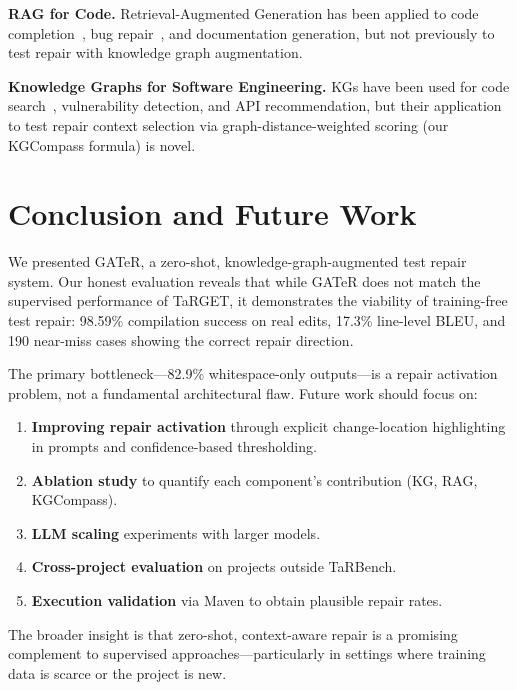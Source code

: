 \documentclass[conference,10pt]{IEEEtran}
\begin{document}
\textbf{RAG for Code.}  Retrieval-Augmented Generation has been applied
to code completion~\cite{rag_code2023}, bug repair~\cite{rag_repair2024},
and documentation generation, but not previously to test repair with
knowledge graph augmentation.

\textbf{Knowledge Graphs for Software Engineering.}
KGs have been used for code search~\cite{kg_search2022}, vulnerability
detection, and API recommendation, but their application to test repair
context selection via graph-distance-weighted scoring (our KGCompass
formula) is novel.

\section{Conclusion and Future Work}
\label{sec:conclusion}

We presented GATeR, a zero-shot, knowledge-graph-augmented test repair
system.  Our honest evaluation reveals that while GATeR does not match
the supervised performance of TaRGET, it demonstrates the viability of
training-free test repair: 98.59\% compilation success on real edits,
17.3\% line-level BLEU, and 190 near-miss cases showing the correct
repair direction.

The primary bottleneck---82.9\% whitespace-only outputs---is a repair
activation problem, not a fundamental architectural flaw.  Future work
should focus on:
\begin{enumerate}
  \item \textbf{Improving repair activation} through explicit
        change-location highlighting in prompts and confidence-based
        thresholding.
  \item \textbf{Ablation study} to quantify each component's
        contribution (KG, RAG, KGCompass).
  \item \textbf{LLM scaling} experiments with larger models.
  \item \textbf{Cross-project evaluation} on projects outside TaRBench.
  \item \textbf{Execution validation} via Maven to obtain plausible
        repair rates.
\end{enumerate}

The broader insight is that zero-shot, context-aware repair is a
promising complement to supervised approaches---particularly in
settings where training data is scarce or the project is new.
\end{document}
